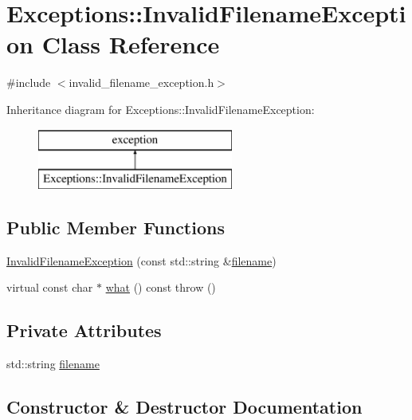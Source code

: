 \hypertarget{class_exceptions_1_1_invalid_filename_exception}{}\section{Exceptions\+:\+:Invalid\+Filename\+Exception Class Reference}
\label{class_exceptions_1_1_invalid_filename_exception}


{\ttfamily \#include $<$invalid\+\_\+filename\+\_\+exception.\+h$>$}

Inheritance diagram for Exceptions\+:\+:Invalid\+Filename\+Exception\+:\begin{figure}[H]
\begin{center}
\leavevmode
\includegraphics[height=2.000000cm]{class_exceptions_1_1_invalid_filename_exception}
\end{center}
\end{figure}
\subsection*{Public Member Functions}
\begin{DoxyCompactItemize}
\item 
\hyperlink{class_exceptions_1_1_invalid_filename_exception_aa931ab35f59e347af1b19322c02debe3}{Invalid\+Filename\+Exception} (const std\+::string \&\hyperlink{class_exceptions_1_1_invalid_filename_exception_a3c92e5e736e002495079a1537145549e}{filename})
\item 
virtual const char $\ast$ \hyperlink{class_exceptions_1_1_invalid_filename_exception_a4141ce1dc20a4cd02f82ea5a954f716d}{what} () const   throw ()
\end{DoxyCompactItemize}
\subsection*{Private Attributes}
\begin{DoxyCompactItemize}
\item 
std\+::string \hyperlink{class_exceptions_1_1_invalid_filename_exception_a3c92e5e736e002495079a1537145549e}{filename}
\end{DoxyCompactItemize}


\subsection{Constructor \& Destructor Documentation}
\hypertarget{class_exceptions_1_1_invalid_filename_exception_aa931ab35f59e347af1b19322c02debe3}{}
